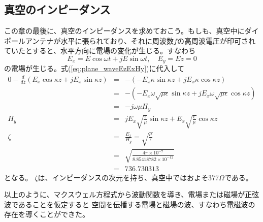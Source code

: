 \subsection{真空のインピーダンス}
この章の最後に、真空のインピーダンスを求めておこう。もしも、真空中にダイポールアンテナが水平に張られており、それに周波数$f$の高周波電圧が印可されていたとすると、水平方向に電場の変化が生じる。すなわち
\[
E_x = E\cos\omega t + jE\sin\omega t, \quad E_y=Ez=0
\]
の電場が生じる。式(\ref{eq:plane_waveEzExHy})に代入して
\begin{eqnarray}
0 - \frac{d}{dz}(E_x\cos\kappa z + jE_x\sin\kappa z) &=& -(-E_x\kappa\sin\kappa z + jE_x\kappa\cos\kappa z) \nonumber\\
&=&-(-E_x\omega\sqrt{\mu\epsilon}\sin\kappa z + jE_x\omega\sqrt{\mu\epsilon}\cos\kappa z) \nonumber\\
&=&-j\omega\mu H_y \nonumber\\
H_y&=&jE_x\sqrt{\frac{\epsilon}{\mu}}\sin\kappa z + E_x\sqrt{\frac{\epsilon}{\mu}}\cos\kappa z \nonumber\\
\zeta &=&\frac{E_x}{H_y} = \sqrt{\frac{\mu}{\epsilon}} \nonumber\\
&=& \sqrt{\frac{4\pi \times 10^{-7}}{8.85418782 \times 10^{-12}}} \nonumber\\ 
&=& 736.730313
\end{eqnarray}
となる。
$\zeta$は、インピーダンスの次元を持ち、真空中ではおよそ377$\Omega$である。


以上のように、マクスウェル方程式から波動関数を導き、電場または磁場が正弦波であることを仮定すると
空間を伝播する電場と磁場の波、すなわち電磁波の存在を導くことができた。
